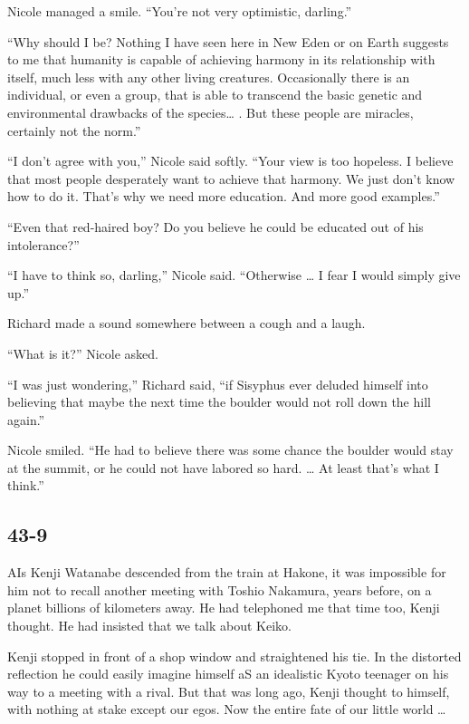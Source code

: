 \documentclass[]{article}
\begin{document}
{Nicole managed a smile. “You’re not very optimistic, darling.”

“Why should I be? Nothing I have seen here in New Eden or on Earth suggests to me that humanity is capable of achieving harmony in its relationship with itself, much less with any other living creatures. Occasionally there is an individual, or even a group, that is able to transcend the basic genetic and environmental drawbacks of the species… . But these people are miracles, certainly not the norm.”

“I don’t agree with you,” Nicole said softly. “Your view is too hopeless. I believe that most people desperately want to achieve that harmony. We just don’t know how to do it. That’s why we need more education. And more good examples.”

“Even that red-haired boy? Do you believe he could be educated out of his intolerance?”

“I have to think so, darling,” Nicole said. “Otherwise … I fear I would simply give up.”

Richard made a sound somewhere between a cough and a laugh.

“What is it?” Nicole asked.

“I was just wondering,” Richard said, “if Sisyphus ever deluded himself into believing that maybe the next time the boulder would not roll down the hill again.”

Nicole smiled. “He had to believe there was some chance the boulder would stay at the summit, or he could not have labored so hard. … At least that’s what I think.”



\subsection{43-9}

AIs Kenji Watanabe descended from the train at Hakone, it was impossible for him not to recall another meeting with Toshio Nakamura, years before, on a planet billions of kilometers away. He had telephoned me that time too, Kenji thought. He had insisted that we talk about Keiko.

Kenji stopped in front of a shop window and straightened his tie. In the distorted reflection he could easily imagine himself aS an idealistic Kyoto teenager on his way to a meeting with a rival. But that was long ago, Kenji thought to himself, with nothing at stake except our egos. Now the entire fate of our little world …

}
\end{document}
